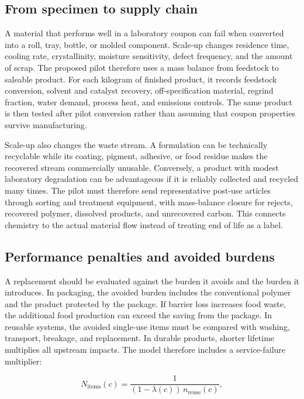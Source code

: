 \documentclass[conference]{IEEEtran}
\begin{document}
\subsection{From specimen to supply chain}

A material that performs well in a laboratory coupon can fail when converted into a roll, tray, bottle, or molded component. Scale-up changes residence time, cooling rate, crystallinity, moisture sensitivity, defect frequency, and the amount of scrap. The proposed pilot therefore uses a mass balance from feedstock to saleable product. For each kilogram of finished product, it records feedstock conversion, solvent and catalyst recovery, off-specification material, regrind fraction, water demand, process heat, and emissions controls. The same product is then tested after pilot conversion rather than assuming that coupon properties survive manufacturing.

Scale-up also changes the waste stream. A formulation can be technically recyclable while its coating, pigment, adhesive, or food residue makes the recovered stream commercially unusable. Conversely, a product with modest laboratory degradation can be advantageous if it is reliably collected and recycled many times. The pilot must therefore send representative post-use articles through sorting and treatment equipment, with mass-balance closure for rejects, recovered polymer, dissolved products, and unrecovered carbon. This connects chemistry to the actual material flow instead of treating end of life as a label.

\subsection{Performance penalties and avoided burdens}

A replacement should be evaluated against the burden it avoids and the burden it introduces. In packaging, the avoided burden includes the conventional polymer and the product protected by the package. If barrier loss increases food waste, the additional food production can exceed the saving from the package. In reusable systems, the avoided single-use items must be compared with washing, transport, breakage, and replacement. In durable products, shorter lifetime multiplies all upstream impacts. The model therefore includes a service-failure multiplier:

\begin{equation}
N_{\mathrm{items}}(c)=\frac{1}{(1-\lambda(c))\,n_{\mathrm{reuse}}(c)},
\label{eq:service_multiplier}
\end{equation}
\end{document}
